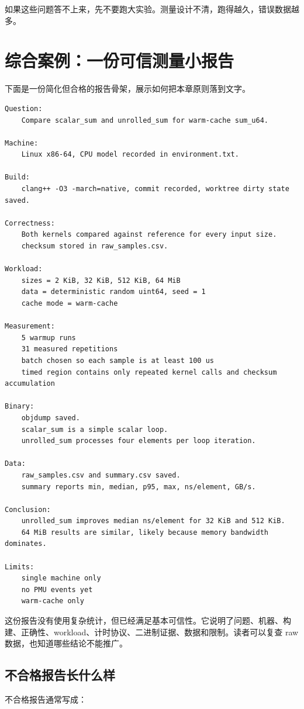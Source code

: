 如果这些问题答不上来，先不要跑大实验。测量设计不清，跑得越久，错误数据越多。

\section{综合案例：一份可信测量小报告}

下面是一份简化但合格的报告骨架，展示如何把本章原则落到文字。

\begin{lstlisting}
Question:
    Compare scalar_sum and unrolled_sum for warm-cache sum_u64.

Machine:
    Linux x86-64, CPU model recorded in environment.txt.

Build:
    clang++ -O3 -march=native, commit recorded, worktree dirty state saved.

Correctness:
    Both kernels compared against reference for every input size.
    checksum stored in raw_samples.csv.

Workload:
    sizes = 2 KiB, 32 KiB, 512 KiB, 64 MiB
    data = deterministic random uint64, seed = 1
    cache mode = warm-cache

Measurement:
    5 warmup runs
    31 measured repetitions
    batch chosen so each sample is at least 100 us
    timed region contains only repeated kernel calls and checksum accumulation

Binary:
    objdump saved.
    scalar_sum is a simple scalar loop.
    unrolled_sum processes four elements per loop iteration.

Data:
    raw_samples.csv and summary.csv saved.
    summary reports min, median, p95, max, ns/element, GB/s.

Conclusion:
    unrolled_sum improves median ns/element for 32 KiB and 512 KiB.
    64 MiB results are similar, likely because memory bandwidth dominates.

Limits:
    single machine only
    no PMU events yet
    warm-cache only
\end{lstlisting}

这份报告没有使用复杂统计，但已经满足基本可信性。它说明了问题、机器、构建、正确性、workload、计时协议、二进制证据、数据和限制。读者可以复查 raw 数据，也知道哪些结论不能推广。

\subsection{不合格报告长什么样}

不合格报告通常写成：

